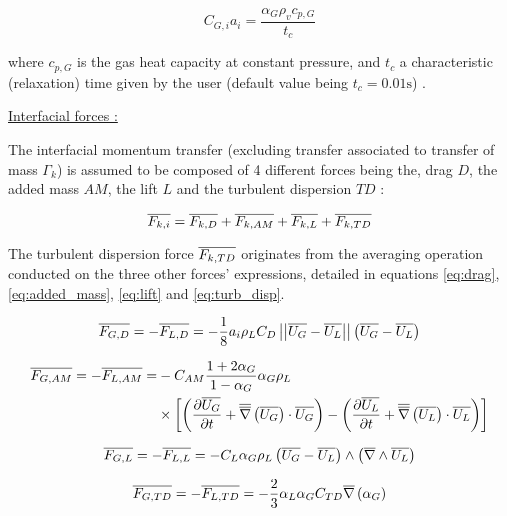 \begin{equation}
\label{eq:gas_relaxation}
C_{G,i}a_{i}=\frac{\alpha_{G}\rho_{v}c_{p,G}}{t_{c}}
\end{equation}

where $c_{p,G}$ is the gas heat capacity at constant pressure, and $t_{c}$ a characteristic (relaxation) time given by the user (default value being $t_{c}=0.01\text{s}$) .

\underline{Interfacial forces :}

The interfacial momentum transfer (excluding transfer associated to transfer of mass $\Gamma_{k}$) is assumed to be composed of 4 different forces being the, drag $D$, the added mass $AM$, the lift $L$ and the turbulent dispersion $TD$ :

\begin{equation}
\label{eq:force_balance}
\overline{F_{k,i}}=\overline{F_{k,D}} + \overline{F_{k,AM}} +\overline{F_{k,L}} +\overline{F_{k,TD}}
\end{equation}

The turbulent dispersion force $\overline{F_{k,TD}}$ originates from the averaging operation conducted on the three other forces' expressions, detailed in equations \ref{eq:drag}, \ref{eq:added_mass}, \ref{eq:lift} and \ref{eq:turb_disp}.


\begin{equation}
\label{eq:drag}
\overline{F_{G,D}}=-\overline{F_{L,D}}=-\frac{1}{8}a_{i}\rho_{L}C_{D}\left|\left|{ \overline{U_{G}}-\overline{U_{L}} }\right|\right|\left( \overline{U_{G}}-\overline{U_{L}}  \right)
\end{equation}

\begin{equation}
\label{eq:added_mass}
\begin{aligned}
\overline{F_{G,AM}}=-\overline{F_{L,AM}}=&-C_{AM} \frac{1+2\alpha_{G}}{1-\alpha_{G}}\alpha_{G}\rho_{L}\\
&\times \left[  \left( \frac{\partial{\overline{U_{G}}}}{\partial t}+\overline{\overline{\nabla}}\left({\overline{U_{G}}}\right)\cdot \overline{U_{G}}  \right) - \left( \frac{\partial{\overline{U_{L}}}}{\partial t}+\overline{\overline{\nabla}}\left({\overline{U_{L}}}\right)\cdot \overline{U_{L}}  \right)  \right]
\end{aligned}
\end{equation}

\begin{equation}
\label{eq:lift}
\overline{F_{G,L}}=-\overline{F_{L,L}}=-C_{L}\alpha_{G}\rho_{L}\left( \overline{U_{G}}-\overline{U_{L}}  \right)\wedge \left( \overline{\nabla}\wedge{\overline{U_{L}}}  \right)
\end{equation}

\begin{equation}
\label{eq:turb_disp}
\overline{F_{G,TD}}=-\overline{F_{L,TD}}=-\frac{2}{3}\alpha_{L}\alpha_{G}C_{TD}\overline{\nabla}\left({\alpha_{G}}\right)
\end{equation}

